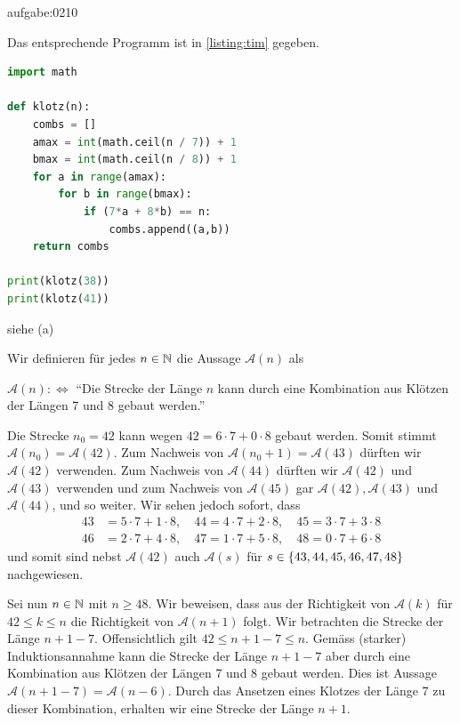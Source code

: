 \begin{antwort}{aufgabe:0210}
\begin{aenum}
    \item Das entsprechende Programm ist in \cref{listing:tim} gegeben.
\begin{lstlisting}[language=Python,caption=Bauklötze,label=listing:tim]
import math

def klotz(n):
    combs = []
    amax = int(math.ceil(n / 7)) + 1
    bmax = int(math.ceil(n / 8)) + 1
    for a in range(amax):
        for b in range(bmax):
            if (7*a + 8*b) == n:
                combs.append((a,b))
    return combs

print(klotz(38))
print(klotz(41))
\end{lstlisting}
    \item siehe (a)
    \item
Wir definieren für jedes $n\in\mathbb{N}$ die Aussage $\mathcal{A}(n)$ als
\begin{center}
    $\mathcal{A}(n) :\iff $ \enquote{Die Strecke der Länge $n$ kann durch eine Kombination aus Klötzen der Längen 7 und 8 gebaut werden.}
\end{center}
Die Strecke $n_0 = 42$ kann wegen $42 = 6\cdot 7 + 0\cdot 8$ gebaut werden. Somit stimmt $\mathcal{A}(n_0)=\mathcal{A}(42)$. Zum Nachweis von $\mathcal{A}(n_0+1)=\mathcal{A}(43)$ dürften wir $\mathcal{A}(42)$ verwenden. Zum Nachweis von $\mathcal{A}(44)$ dürften wir $\mathcal{A}(42)$ und $\mathcal{A}(43)$ verwenden und zum Nachweis von $\mathcal{A}(45)$ gar $\mathcal{A}(42), \mathcal{A}(43)$ und $\mathcal{A}(44)$, und so weiter. Wir sehen jedoch sofort, dass
\begin{align*}
    43 &= 5\cdot 7 + 1\cdot 8, \quad 44 = 4\cdot 7 + 2\cdot 8, \quad 45 = 3\cdot 7 + 3\cdot 8 \\
    46 &= 2\cdot 7 + 4\cdot 8, \quad 47 = 1\cdot 7 + 5\cdot 8, \quad 48 = 0\cdot 7 + 6\cdot 8
\end{align*}
und somit sind nebst $\mathcal{A}(42)$ auch $\mathcal{A}(s)$ für $s\in\left\{43,44,45,46,47,48\right\}$ nachgewiesen.

Sei nun $n\in\mathbb{N}$ mit $n\geq 48$. Wir beweisen, dass aus der Richtigkeit von $\mathcal{A}(k)$ für $42\leq k \leq n$ die Richtigkeit von $\mathcal{A}(n+1)$ folgt. Wir betrachten die Strecke der Länge $n+1-7$. Offensichtlich gilt $42\leq n+1-7\leq n$. Gemäss (starker) Induktionsannahme kann die Strecke der Länge $n+1-7$ aber durch eine Kombination aus Klötzen der Längen 7 und 8 gebaut werden. Dies ist Aussage $\mathcal{A}(n+1-7) = \mathcal{A}(n-6)$. Durch das Ansetzen eines Klotzes der Länge 7 zu dieser Kombination, erhalten wir eine Strecke der Länge $n+1$.
\end{aenum}
\end{antwort}

